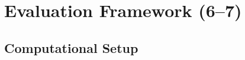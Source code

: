 \cleardoublepage
\chapter{Evaluation Framework (6--7)}   %
\label{ch:eval}

\section{Computational Setup}
\label{sec:eval-compute}
\label{sec:eval-hyperopt}      %

